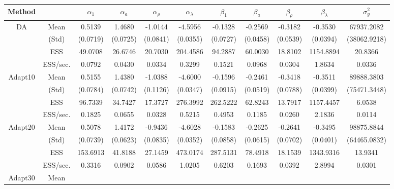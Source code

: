 {\footnotesize 
{ \renewcommand{\arraystretch}{1.2} 
\begin{table} 
\hspace*{-2.5cm} 
\begin{tabular}{cc ccc ccc ccc} 
\hline 
 Method & &  $\alpha_{1}$ &  $\alpha_{a}$ &  $\alpha_{\rho}$ &  $\alpha_{\lambda}$ &  $\beta_{1}$ &  $\beta_{a}$ &  $\beta_{\rho}$ &  $\beta_{\lambda}$ &  $\sigma^{2}_{y}$  \\ \hline  \hline
\rowcolor{LightCyan}DA & Mean 
 & 0.5139  & 1.4680  & -1.0144  & -4.5956  & -0.1328  & -0.2569  & -0.3182  & -0.3530  & 67937.2082  \\  [0.75ex] 
 & (Std) 
 & (0.0719)  & (0.0725)  & (0.0841)  & (0.0355)  & (0.0727)  & (0.0458)  & (0.0539)  & (0.0394)  & (38062.9218)  \\  [0.75ex] 
 & ESS 
 & 49.0708  & 26.6746  & 20.7030  & 204.4586  & 94.2887  & 60.0030  & 18.8102  & 1154.8894  & 20.8366  \\  [0.75ex] 
[619.76 s]  & ESS/sec. 
 & 0.0792  & 0.0430  & 0.0334  & 0.3299  & 0.1521  & 0.0968  & 0.0304  & 1.8634  & 0.0336  \\  [1.3ex] 
\rowcolor{LightCyan}Adapt10 & Mean 
 & 0.5155  & 1.4380  & -1.0388  & -4.6000  & -0.1596  & -0.2461  & -0.3418  & -0.3511  & 89888.3803  \\  [0.75ex] 
 & (Std) 
 & (0.0784)  & (0.0742)  & (0.1126)  & (0.0347)  & (0.0915)  & (0.0519)  & (0.0788)  & (0.0399)  & (75471.3448)  \\  [0.75ex] 
 & ESS 
 & 96.7339  & 34.7427  & 17.3727  & 276.3992  & 262.5222  & 62.8243  & 13.7917  & 1157.4457  & 6.0538  \\  [0.75ex] 
[530.05 s]  & ESS/sec. 
 & 0.1825  & 0.0655  & 0.0328  & 0.5215  & 0.4953  & 0.1185  & 0.0260  & 2.1836  & 0.0114  \\  [1.3ex] 
\rowcolor{LightCyan}Adapt20 & Mean 
 & 0.5078  & 1.4172  & -0.9436  & -4.6028  & -0.1583  & -0.2625  & -0.2641  & -0.3495  & 98875.8844  \\  [0.75ex] 
 & (Std) 
 & (0.0739)  & (0.0623)  & (0.0835)  & (0.0352)  & (0.0858)  & (0.0615)  & (0.0702)  & (0.0401)  & (64465.0832)  \\  [0.75ex] 
 & ESS 
 & 153.6913  & 41.8188  & 27.1459  & 473.0174  & 287.5131  & 78.4918  & 18.1539  & 1343.9316  & 13.9341  \\  [0.75ex] 
[463.52 s]  & ESS/sec. 
 & 0.3316  & 0.0902  & 0.0586  & 1.0205  & 0.6203  & 0.1693  & 0.0392  & 2.8994  & 0.0301  \\  [1.3ex] 
\rowcolor{LightCyan}Adapt30 & Mean 

\end{tabular}
\end{table}}}
